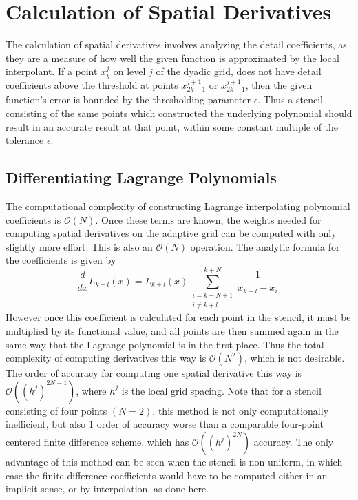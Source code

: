 \documentclass[11pt]{article}
\begin{document}
\section{Calculation of Spatial Derivatives}
The calculation of spatial derivatives involves analyzing the detail coefficients, as they are a measure of how well the 
given function is approximated by the local interpolant. If a point $x_{k}^{j}$ on level $j$ of the dyadic grid, does not have 
detail coefficients above the threshold at points $x_{2k+1}^{j+1}$ or $x_{2k-1}^{j+1}$, then the given function's error is
bounded by the thresholding parameter $\epsilon$.  Thus a stencil consisting of the same points
which constructed the underlying polynomial should result in an accurate result at that point, 
within some constant multiple of the tolerance $\epsilon$.

\subsection{Differentiating Lagrange Polynomials} 
The computational complexity of constructing Lagrange interpolating polynomial coefficients is $\mathcal{O}(N)$. 
Once these terms are known, the weights needed for computing spatial derivatives on the adaptive grid can be computed with only slightly more effort. This is also an $\mathcal{O}(N)$ operation. 
The analytic formula for the coefficients is given by
\begin{equation}
    \frac{d}{dx} L_{k+l}(x) = L_{k+l}(x) \sum_{ \substack{ i=k-N+1 \\ i\neq k+l } }^{k+N} \frac{1}{x_{k+l}-x_i}.
\end{equation}
However once this coefficient is calculated for each point in the stencil, it must be multiplied by its functional value, 
and all points are then summed again in the same way that the Lagrange polynomial is in the first place. 
Thus the total complexity of computing derivatives this way is $\mathcal{O}(N^2)$, which is not desirable. The order of 
accuracy for computing one spatial derivative this way is $\mathcal{O}((h^j)^{2N-1})$, where $h^j$ is the local grid spacing. 
Note that for a stencil consisting of four points $(N=2)$, this method is not only computationally inefficient, but also 1 order 
of accuracy worse than a comparable four-point centered finite difference scheme, which has $\mathcal{O}((h^j)^{2N})$
accuracy. The only advantage of this method can be seen when the stencil is non-uniform, in which case the finite difference 
coefficients would have to be computed either in an implicit sense, or by interpolation, as done here.
\end{document}
